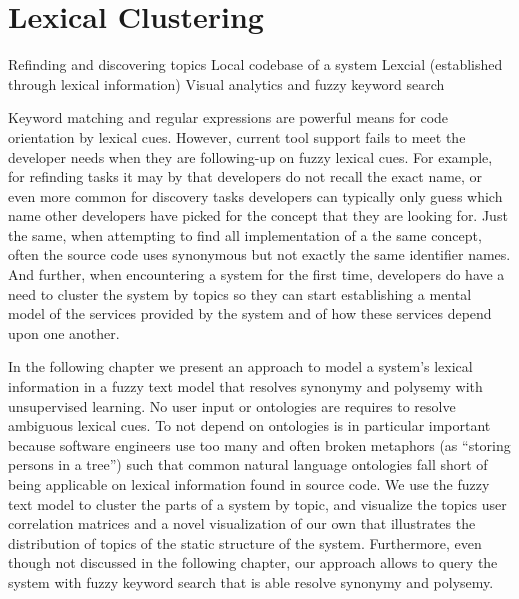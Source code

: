 

\chapter{Lexical Clustering}
\label{the chapter on hapax}

\infobox
	{Refinding and discovering topics}
	{Local codebase of a system}
	{Lexcial (established through lexical information)}
	{Visual analytics and fuzzy keyword search}

Keyword matching and regular expressions are powerful means for code orientation by lexical cues. However, current tool support fails to meet the developer needs when they are following-up on fuzzy lexical cues. For example, for refinding tasks it may by that developers do not recall the exact name, or even more common for discovery tasks developers can typically only guess which name other developers have picked for the concept that they are looking for. Just the same, when attempting to find all implementation of a the same concept, often the source code uses synonymous but not exactly the same identifier names. And further, when encountering a system for the first time, developers do have a need to cluster the system by topics so they can start establishing a mental model of the services provided by the system and of how these services depend upon one another. 

In the following chapter we present an approach to model a system's lexical information in a fuzzy text model that resolves synonymy and polysemy with unsupervised learning. No user input or ontologies are requires to resolve ambiguous lexical cues. To not depend on ontologies is in particular important because software engineers use too many and often broken metaphors (as \eg ``storing persons in a tree'') such that common natural language ontologies fall short of being applicable on lexical information found in source code. We use the fuzzy text model to cluster the parts of a system by topic, and visualize the topics user correlation matrices and a novel visualization of our own that illustrates the distribution of topics of the static structure of the system. Furthermore, even though not discussed in the following chapter, our approach allows to query the system with fuzzy keyword search that is able resolve synonymy and polysemy.

